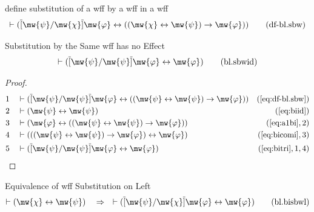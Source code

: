 \begin{metadefinition} define substitution of a wff by a wff in a wff
\begin{align}
\vdash ( \overline{[} \mw{\psi} / \mw{\chi} \overline{]} \mw{\varphi} \leftrightarrow ( ( \mw{\chi} \leftrightarrow \mw{\psi} ) \rightarrow \mw{\varphi} ) )\label{eq:df-bl.sbw}\tag{df-bl.sbw}
\end{align}
\end{metadefinition}


\begin{lemma} Substitution by the Same wff has no Effect
\begin{align}
\vdash ( \overline{[} \mw{\psi} / \mw{\psi} \overline{]} \mw{\varphi} \leftrightarrow \mw{\varphi} )\label{eq:bl.sbwid}\tag{bl.sbwid}
\end{align}
\end{lemma}

\begin{proof}
\begin{align}
  1 &&  & \vdash ( \overline{[} \mw{\psi} / \mw{\psi} \overline{]} \mw{\varphi} \leftrightarrow ( ( \mw{\psi} \leftrightarrow \mw{\psi} ) \rightarrow \mw{\varphi} ) )&(\mbox{\ref{eq:df-bl.sbw}})\notag
  \\ 2 &&  & \vdash ( \mw{\psi} \leftrightarrow \mw{\psi} )&(\mbox{\ref{eq:biid}})\notag
  \\ 3 &&  & \vdash ( \mw{\varphi} \leftrightarrow ( ( \mw{\psi} \leftrightarrow \mw{\psi} ) \rightarrow \mw{\varphi} ) )&(\mbox{\ref{eq:a1bi}},2)\notag
  \\ 4 &&  & \vdash ( ( ( \mw{\psi} \leftrightarrow \mw{\psi} ) \rightarrow \mw{\varphi} ) \leftrightarrow \mw{\varphi} )&(\mbox{\ref{eq:bicomi}},3)\notag
  \\ 5 &&  & \vdash ( \overline{[} \mw{\psi} / \mw{\psi} \overline{]} \mw{\varphi} \leftrightarrow \mw{\varphi} )&(\mbox{\ref{eq:bitri}},1,4)\notag
\end{align}
\end{proof}

\begin{lemma} Equivalence of wff Substitution on Left
\begin{align}
\vdash ( \mw{\chi} \leftrightarrow \mw{\psi} )\quad\Rightarrow\quad \vdash ( \overline{[} \mw{\psi} / \mw{\chi} \overline{]} \mw{\varphi} \leftrightarrow \mw{\varphi} )\label{eq:bl.bisbwl}\tag{bl.bisbwl}
\end{align}
\end{lemma}

